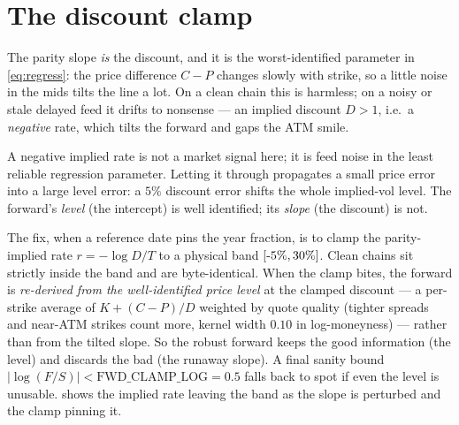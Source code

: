 \documentclass[11pt]{article}
\begin{document}
\section{The discount clamp}
\label{sec:clamp}

The parity slope \emph{is} the discount, and it is the worst-identified parameter
in \eqref{eq:regress}: the price difference $C-P$ changes slowly with strike, so a
little noise in the mids tilts the line a lot. On a clean chain this is harmless; on
a noisy or stale delayed feed it drifts to nonsense --- an implied discount $D>1$,
i.e.\ a \emph{negative} rate, which tilts the forward and gaps the ATM smile.

\begin{caution}
A negative implied rate is not a market signal here; it is feed noise in the least
reliable regression parameter. Letting it through propagates a small price error
into a large level error: a $5\%$ discount error shifts the whole implied-vol level.
The forward's \emph{level} (the intercept) is well identified; its \emph{slope}
(the discount) is not.
\end{caution}

The fix, when a reference date pins the year fraction, is to clamp the
parity-implied rate $r=-\log D/T$ to a physical band
$[\text{-5}\%,\text{30}\%]$. Clean chains sit strictly inside the
band and are byte-identical. When the clamp bites, the forward is \emph{re-derived
from the well-identified price level} at the clamped discount --- a per-strike
average of $K+(C-P)/D$ weighted by quote quality (tighter spreads and
near-ATM strikes count more, kernel width $0.10$ in log-moneyness) --- rather
than from the tilted slope. So the robust forward keeps the good information
(the level) and discards the bad (the runaway slope). A final sanity bound
$|\log(F/S)|<\text{FWD\_CLAMP\_LOG}=0.5$ falls back to spot if even the level
is unusable.  shows the implied rate leaving the band as the
slope is perturbed and the clamp pinning it.
\end{document}
